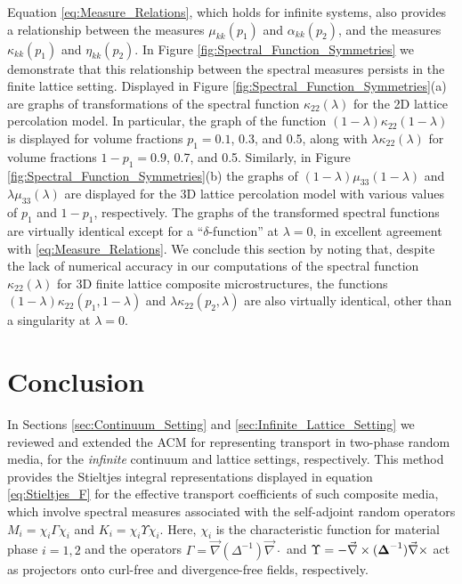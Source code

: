 \documentclass{cmslatex}
\newcommand\bDelta{\mbox{\boldmath${\Delta}$}}
\begin{document}
Equation \eqref{eq:Measure_Relations}, which holds for infinite
systems, also provides a relationship 
between the measures $\mu_{kk}(p_1)$ and $\alpha_{kk}(p_2)$, and the measures
$\kappa_{kk}(p_1)$ and $\eta_{kk}(p_2)$. In Figure \ref{fig:Spectral_Function_Symmetries} we
demonstrate that this relationship between the spectral measures
persists in the finite lattice setting. Displayed in Figure
\ref{fig:Spectral_Function_Symmetries}(a) are graphs of 
transformations of the spectral function $\kappa_{22}(\lambda)$ for the 2D
lattice percolation model. In particular,
the graph of the function $(1-\lambda)\kappa_{22}(1-\lambda)$ is displayed for
volume fractions $p_1=0.1$, 0.3, and 0.5, along with $\lambda\kappa_{22}(\lambda)$ for
volume fractions $1-p_1=0.9$, 0.7, and 0.5. Similarly, in Figure
\ref{fig:Spectral_Function_Symmetries}(b) the graphs of
$(1-\lambda)\mu_{33}(1-\lambda)$ and $\lambda\mu_{33}(\lambda)$ are displayed for the 3D lattice
percolation model with various values
of $p_1$ and $1-p_1$, respectively. The graphs of the 
transformed spectral functions are virtually identical except for a
``$\delta$-function'' at $\lambda=0$, in excellent agreement with
\eqref{eq:Measure_Relations}. We conclude this section by noting that,
despite the lack of numerical accuracy in our computations of the
spectral function $\kappa_{22}(\lambda)$ for 3D finite lattice composite
microstructures, the functions $(1-\lambda)\kappa_{22}(p_1,1-\lambda)$ and
$\lambda\kappa_{22}(p_2,\lambda)$ are also virtually identical, other than a singularity
at $\lambda=0$. 








\section{Conclusion}
%
In Sections \ref{sec:Continuum_Setting} and
\ref{sec:Infinite_Lattice_Setting} we reviewed and extended the ACM for
representing transport in two-phase random media, for the
\emph{infinite} continuum and lattice settings, respectively. This
method provides the Stieltjes integral representations displayed in
equation \eqref{eq:Stieltjes_F} for the effective transport
coefficients of such composite media, which involve spectral measures
associated with the self-adjoint random operators $M_i=\chi_i\Gamma\chi_i$ and
$K_i=\chi_i\Upsilon\chi_i$. Here, $\chi_i$ is the characteristic function for material
phase $i=1,2$ and the operators $\Gamma=\vec{\nabla}(\Delta^{-1})\vec{\nabla}\cdot$ and
$\Upsilon=-\vec{\nabla}\times(\bDelta^{-1})\vec{\nabla}\times$ act as projectors onto curl-free
and divergence-free fields, respectively. 
\end{document}
